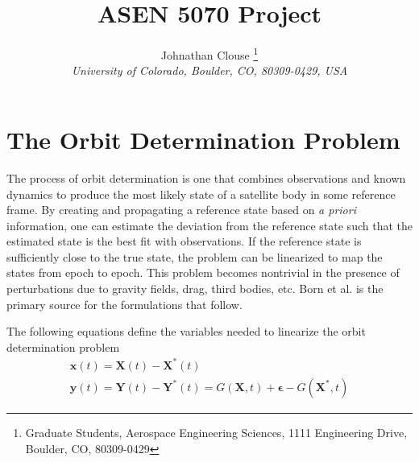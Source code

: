 \documentclass[]{aiaa-tc}%
\title{ASEN 5070 Project}
\author{
	Johnathan Clouse%
	\thanks{Graduate Students, Aerospace Engineering Sciences, 1111 Engineering Drive, Boulder, CO, 80309-0429}\\
	{\normalsize\itshape
		University of Colorado, Boulder, CO, 80309-0429, USA}
}
\begin{document}
	

	
	\maketitle
	
	\begin{abstract}
		\noindent 
		
	\end{abstract}
	
	\newpage
	
	\tableofcontents
	
	\newpage
	
	\section{The Orbit Determination Problem}
	
	 The process of orbit determination is one that combines observations and known dynamics to produce the most likely state of a satellite body in some reference frame.  By creating and propagating a reference state based on \textit{a priori} information, one can estimate the deviation from the reference state such that the estimated state is the best fit with observations. If the reference state is sufficiently close to the true state, the problem can be linearized to map the states from epoch to epoch.  This problem becomes nontrivial in the presence of perturbations due to gravity fields, drag, third bodies, etc.  Born et al. is the primary source for the formulations that follow.
	
	\vspace{5 mm}
	
	 The following equations define the variables needed to linearize the orbit determination problem
	\begin{equation}
	\begin{matrix}
	\mathbf{x}(t)=\mathbf{X}(t)-\mathbf{X}^{*}(t) \\
	\mathbf{y}(t)=\mathbf{Y}(t)-\mathbf{Y}^{*}(t)=G(\mathbf{X},t)+\boldsymbol{\epsilon}-G(\mathbf{X}^{*},t)
	\end{matrix}
	\end{equation}
\end{document}
